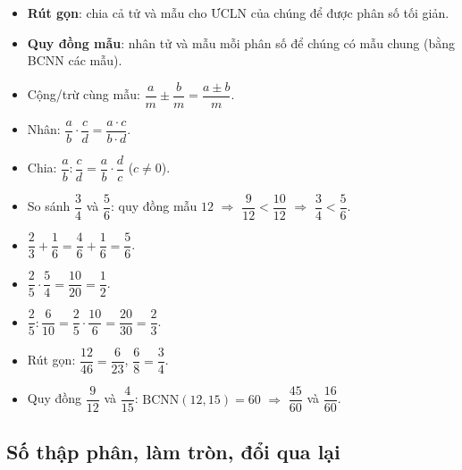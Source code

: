 \documentclass[12pt,a4paper]{article}
\begin{document}
\begin{phuongphap}[title={Rút gọn \& Quy đồng}]
\begin{itemize}
  \item \textbf{Rút gọn}: chia cả tử và mẫu cho ƯCLN của chúng để được phân số tối giản.
  \item \textbf{Quy đồng mẫu}: nhân tử và mẫu mỗi phân số để chúng có mẫu chung (bằng BCNN các mẫu).
\end{itemize}
\end{phuongphap}

\begin{congthuc}[title={Bốn phép tính với phân số}]
\begin{itemize}
  \item Cộng/trừ cùng mẫu: $\dfrac{a}{m} \pm \dfrac{b}{m} = \dfrac{a \pm b}{m}$.
  \item Nhân: $\dfrac{a}{b} \cdot \dfrac{c}{d} = \dfrac{a \cdot c}{b \cdot d}$.
  \item Chia: $\dfrac{a}{b} : \dfrac{c}{d} = \dfrac{a}{b} \cdot \dfrac{d}{c}$ \quad ($c \ne 0$).
\end{itemize}
\end{congthuc}

\begin{vidu}
\begin{itemize}
  \item So sánh $\dfrac{3}{4}$ và $\dfrac{5}{6}$: quy đồng mẫu $12$ $\Rightarrow$ $\dfrac{9}{12} < \dfrac{10}{12}$ $\Rightarrow$ $\dfrac{3}{4} < \dfrac{5}{6}$.
  \item $\dfrac{2}{3} + \dfrac{1}{6} = \dfrac{4}{6} + \dfrac{1}{6} = \dfrac{5}{6}$.
  \item $\dfrac{2}{5} \cdot \dfrac{5}{4} = \dfrac{10}{20} = \dfrac{1}{2}$.
  \item $\dfrac{2}{5} : \dfrac{6}{10} = \dfrac{2}{5} \cdot \dfrac{10}{6} = \dfrac{20}{30} = \dfrac{2}{3}$.
  \item Rút gọn: $\dfrac{12}{46} = \dfrac{6}{23}$, \quad $\dfrac{6}{8} = \dfrac{3}{4}$.
  \item Quy đồng $\dfrac{9}{12}$ và $\dfrac{4}{15}$: $\text{BCNN}(12, 15) = 60$ $\Rightarrow$ $\dfrac{45}{60}$ và $\dfrac{16}{60}$.
\end{itemize}
\end{vidu}

\subsection{Số thập phân, làm tròn, đổi qua lại}
\end{document}
